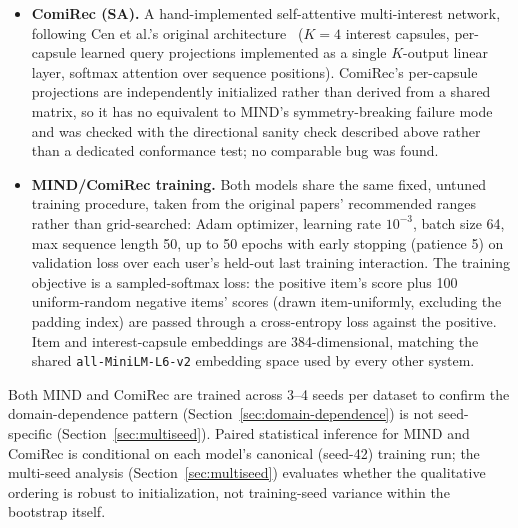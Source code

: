 \documentclass[11pt,a4paper]{article}
\begin{document}
\begin{itemize}[leftmargin=*, itemsep=3pt]
        across capsules, guaranteed every capsule updated identically,
        silently collapsing the model's effective interest count to 1
        regardless of the nominal $K$. The test
        (\texttt{test\_mind\_\allowbreak routing.py}) caught this before
        any number reported here was generated; catching a real,
        non-obvious bug is the evidence the verification method works, not
        just a disclosed limitation.
  \item \textbf{ComiRec (SA).} A hand-implemented self-attentive
        multi-interest network, following Cen et al.'s original
        architecture~\cite{cen2020} ($K=4$ interest capsules, per-capsule
        learned query projections implemented as a single $K$-output
        linear layer, softmax attention over sequence positions). ComiRec's
        per-capsule projections are independently initialized rather than
        derived from a shared matrix, so it has no equivalent to MIND's
        symmetry-breaking failure mode and was checked with the directional
        sanity check described above rather than a dedicated conformance
        test; no comparable bug was found.
  \item \textbf{MIND/ComiRec training.} Both models share the same fixed,
        untuned training procedure, taken from the original papers'
        recommended ranges rather than grid-searched: Adam optimizer,
        learning rate $10^{-3}$, batch size 64, max sequence length 50, up
        to 50 epochs with early stopping (patience 5) on validation loss
        over each user's held-out last training interaction. The training
        objective is a sampled-softmax loss: the positive item's score plus
        100 uniform-random negative items' scores (drawn item-uniformly,
        excluding the padding index) are passed through a cross-entropy
        loss against the positive. Item and interest-capsule embeddings are
        384-dimensional, matching the shared \texttt{all-MiniLM-L6-v2}
        embedding space used by every other system.
\end{itemize}

Both MIND and ComiRec are trained across 3--4 seeds per dataset to confirm
the domain-dependence pattern (Section~\ref{sec:domain-dependence}) is not
seed-specific (Section~\ref{sec:multiseed}). Paired statistical inference
for MIND and ComiRec is conditional on each model's canonical (seed-42)
training run; the multi-seed analysis (Section~\ref{sec:multiseed})
evaluates whether the qualitative ordering is robust to initialization,
not training-seed variance within the bootstrap itself.
\end{document}
